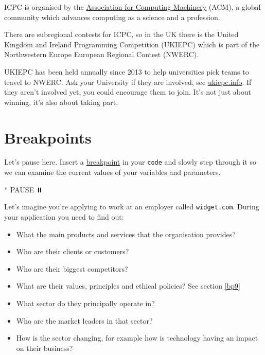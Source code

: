 \documentclass[
]{book}
\newenvironment{Shaded}{\begin{snugshade}}{\end{snugshade}}
\newcommand{\NormalTok}[1]{#1}
\newcommand{\SpecialStringTok}[1]{\textcolor[rgb]{0.31,0.60,0.02}{#1}}
\providecommand{\tightlist}{%
  \setlength{\itemsep}{0pt}\setlength{\parskip}{0pt}}
\begin{document}
ICPC is organised by the \href{https://en.wikipedia.org/wiki/Association_for_Computing_Machinery}{Association for Computing Machinery} (ACM), a global community which advances computing as a science and a profession.

There are subregional contests for ICPC, so in the UK there is the United Kingdom and Ireland Programming Competition (UKIEPC) which is part of the Northwestern Europe European Regional Contest (NWERC).

UKIEPC has been held annually since 2013 to help universities pick teams to travel to NWERC. Ask your University if they are involved, see \href{http://ukiepc.info}{ukiepc.info}. If they aren't involved yet, you could encourage them to join. It's not just about winning, it's also about taking part.

\hypertarget{bp10}{%
\section{Breakpoints}\label{bp10}}

Let's pause here. Insert a \href{https://en.wikipedia.org/wiki/Breakpoint}{breakpoint} in your \texttt{code} and slowly step through it so we can examine the current values of your variables and parameters.

\begin{Shaded}
\begin{Highlighting}[]
\SpecialStringTok{* }\NormalTok{PAUSE ⏸️}
\end{Highlighting}
\end{Shaded}

Let's imagine you're applying to work at an employer called \texttt{widget.com}. During your application you need to find out:

\begin{itemize}
\tightlist
\item
  What the main products and services that the organisation provides?
\item
  Who are their clients or customers?
\item
  Who are their biggest competitors?
\item
  What are their values, principles and ethical policies? See section \ref{bp9}
\item
  What sector do they principally operate in?
\item
  Who are the market leaders in that sector?
\item
  How is the sector changing, for example how is technology having an impact on their business?
\end{itemize}
\end{document}
